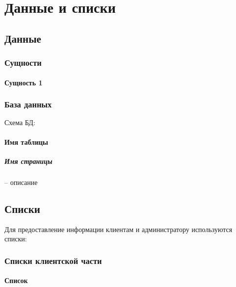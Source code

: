 \section{Данные и списки}

\subsection{Данные}

\subsubsection{Сущности}
\paragraph{Сущность 1}

\subsubsection{База данных}
Схема БД:
\paragraph{Имя таблицы}
\subparagraph{Имя страницы} -- описание

\subsection{Списки}
Для предоставление информации клиентам и администратору используются списки:
\subsubsection{Списки клиентской части}
\paragraph{Список}
